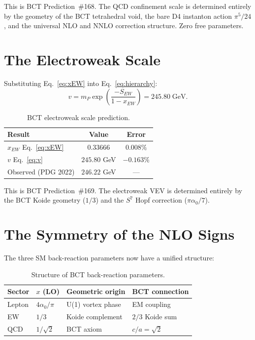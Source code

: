\documentclass[aps,prl,twocolumn,showpacs,preprintnumbers]{revtex4-2}
\newcommand{\azero}{\alpha_0}
\newcommand{\mP}{m_P}
\begin{document}
This is BCT Prediction~\#168.
The QCD confinement scale is determined entirely by the geometry
of the BCT tetrahedral void, the bare D4 instanton action $\pi^5/24$,
and the universal NLO and NNLO correction structure.
Zero free parameters.

\section{The Electroweak Scale}

Substituting Eq.~\eqref{eq:xEW} into Eq.~\eqref{eq:hierarchy}:
\begin{equation}
  v = \mP\exp\!\left(\frac{-S_{EW}}{1-x_{EW}}\right)
  = 245.80\;\text{GeV}.
  \label{eq:v}
\end{equation}
\begin{table}[h]
\centering
\caption{BCT electroweak scale prediction.}
\label{tab:v}
\begin{tabular}{lcc}
\toprule
Result & Value & Error \\
\midrule
$x_{EW}$ Eq.~\eqref{eq:xEW} & $0.33666$ & $0.008\%$ \\
$v$ Eq.~\eqref{eq:v}          & $245.80$ GeV & $\mathbf{-0.163\%}$ \\
\midrule
Observed (PDG 2022)            & $246.22$ GeV & --- \\
\bottomrule
\end{tabular}
\end{table}
This is BCT Prediction~\#169. The electroweak VEV is determined
entirely by the BCT Koide geometry ($1/3$) and the $S^7$ Hopf
correction ($\pi\azero/7$).

\section{The Symmetry of the NLO Signs}

The three SM back-reaction parameters now have a unified structure:
\begin{table}[h]
\centering
\caption{Structure of BCT back-reaction parameters.}
\label{tab:x}
\begin{tabular}{llll}
\toprule
Sector & $x$ (LO) & Geometric origin & BCT connection \\
\midrule
Lepton & $4\azero/\pi$ & U(1) vortex phase & EM coupling \\
EW & $1/3$ & Koide complement & $2/3$ Koide sum \\
QCD & $1/\sqrt{2}$ & BCT axiom & $c/a = \sqrt{2}$ \\
\bottomrule
\end{tabular}
\end{table}
\end{document}

